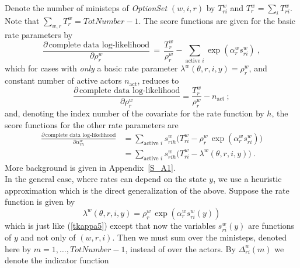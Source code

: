 \documentclass[a4paper,12pt,fleqn]{article}
\begin{document}
Denote the number of ministeps of \textit{OptionSet} $(w,i,r)$
by $T^w_{ri}$ and $T^w_r = \sum_i T^w_{ri}$.
Note that $\sum_{w,r} T^w_r = \textit{TotNumber}-1$.
The score functions are given for the basic rate parameters by
\begin{equation}
 \frac{\partial\, \text{complete data log-likelihood}}{\partial \rho^w_r} \, =
 \, \frac{T^w_r}{\rho^w_r} - \sum_{\text{active } i}
             \exp(\alpha^w_{r} s^w_{ri}) \  , \label{tscore2}
\end{equation}
which for cases with \emph{only} a basic rate parameter
$ \lambda^w(\theta, r,i, y) = \rho^w_r $,
and constant number of active actors $n_{\text{act}}$, reduces to
\begin{equation}
\frac{\partial\, \text{complete data log-likelihood}}{\partial \rho^w_r} =
  \frac{T^w_r}{\rho^w_r}  - n_{\text{act}}  \  ; \label{tscore3}
\end{equation}
and, denoting
the index number of the covariate for the rate function
by $h$, the score functions for the other rate parameters are
\begin{align}
  \frac{\partial \, \text{complete data log-likelihood}}{\partial \alpha^w_{rh}}
  &=                                                        \label{tscore4}
   \sum_{\text{active } i} s^w_{rih} \big(T^w_{ri} -  \rho^w_r \,
                   \exp(\alpha^w_{r} s^w_{ri} )  \big) \\
   &= \sum_{\text{active } i}  s^w_{rih} \big(T^w_{ri} -  \lambda^w(\theta, r,i, y)   \big)
               \ . \nonumber
\end{align}
More background is given in Appendix~\ref{S_A1}.
\vspace{\parskip} \\
\hspace{\parindent}  %
In the general case, where rates can depend on the state $y$,
we use a heuristic approximation which is the direct generalization
of the above.
Suppose the rate function is given by
\begin{equation}
 \lambda^w(\theta, r,i, y) = \rho^w_r \, \exp(\alpha^w_{r} s^w_{ri}(y) )
               \label{tkappa6}
\end{equation}
which is just like (\ref{tkappa5}) except that now the variables
$s^w_{ri}(y)$ are functions of $y$ and not only of $(w,r,i)$.
Then we must sum over the ministeps, denoted here by
$m = 1, \ldots, \textit{TotNumber}-1$, instead of over the
actors.
By $\Delta^w_{ri}(m)$ we denote the indicator function
\end{document}
